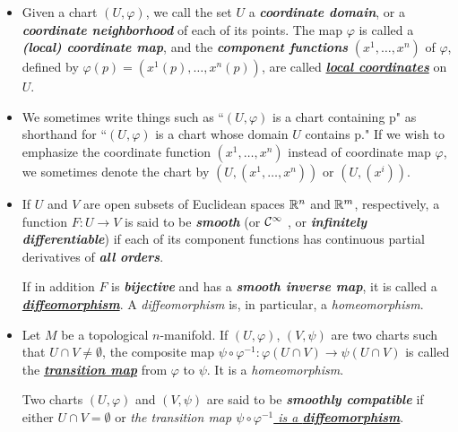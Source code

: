 \documentclass[11pt]{article}
\begin{document}
\begin{itemize}
\item \begin{definition}
Given a chart $(U, \varphi)$, we call the set $U$ a \emph{\textbf{coordinate domain}}, or a \emph{\textbf{coordinate neighborhood}} of each of its points. The map $\varphi$ is called a \emph{\textbf{(local) coordinate map}}, and the \emph{\textbf{component functions}} $(x^1,\ldots, x^n)$ of $\varphi$, defined by $\varphi(p) = (x^1(p), \ldots, x^n(p))$, are called \underline{\emph{\textbf{local coordinates}}} on $U$. 
\end{definition}

\item \begin{remark}
We sometimes write things such as ``$(U, \varphi)$ is a chart containing p" as shorthand for ``$(U, \varphi)$ is a chart whose domain $U$ contains p." If we wish to emphasize the coordinate function $(x^1,\ldots, x^n)$ instead of coordinate map $\varphi$, we sometimes denote the chart by $(U, (x^1,\ldots, x^n))$ or $(U, (x^i))$.
\end{remark}

\item \begin{definition}
If $U$ and $V$ are open subsets of Euclidean spaces ${\mathbb R}^n$ and ${\mathbb R}^m$, respectively, a function $F: U \rightarrow V$ is said to be \emph{\textbf{smooth}} (or ${\mathcal C}^{\infty}$ , or \emph{\textbf{infinitely differentiable}}) if each of its component functions has continuous partial derivatives of \emph{\textbf{all orders}}. 

If in addition $F$ is \emph{\textbf{bijective}} and has a \emph{\textbf{smooth inverse map}}, it is called a \underline{\emph{\textbf{diffeomorphism}}}. A \emph{diffeomorphism} is, in particular, a \emph{homeomorphism}.
\end{definition}

\item \begin{definition}
Let $M$ be a topological $n$-manifold. If $(U, \varphi)$, $(V, \psi)$ are two charts such that $U \cap V \neq \emptyset$, the composite map $\psi \circ \varphi^{-1}: \varphi(U \cap V ) \rightarrow \psi(U \cap V)$ is called the \underline{\emph{\textbf{transition map}}} from $\varphi$ to $\psi$. It is a \emph{homeomorphism}. 

Two charts $(U, \varphi)$ and $(V, \psi)$ are said to be \emph{\textbf{smoothly compatible}} if either $U \cap V = \emptyset$ or \emph{the transition map \underline{$\psi \circ \varphi^{-1}$ is a \textbf{diffeomorphism}}}. 
\end{definition}


\end{itemize}
\end{document}
